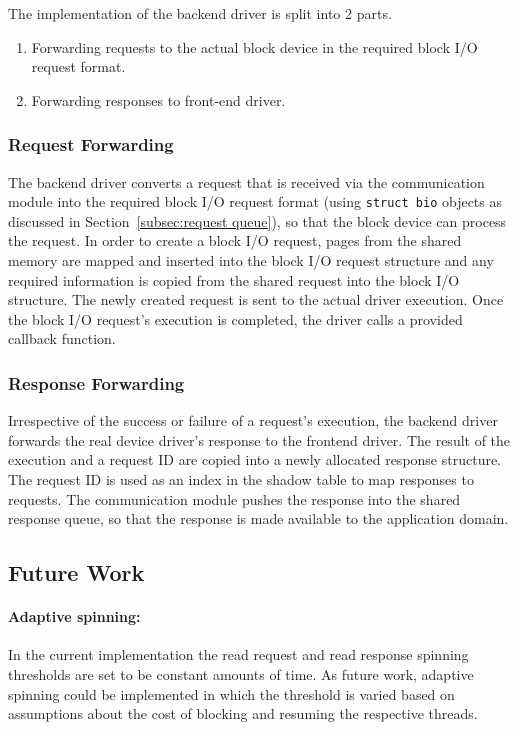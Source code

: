 The implementation of the backend driver is split into 2 parts. 
\begin{enumerate}
\item Forwarding requests to the actual block device in the required block I/O request format. 
\item Forwarding responses to front-end driver.
\end{enumerate}

\subsubsection*{Request Forwarding}
\label{subsec:createbio}
The backend driver converts a request that is received via the
communication module into the required block I/O request format (using \texttt{struct bio} objects
as discussed in Section~\ref{subsec:request queue}), so that the block device
can process the request. In order to create a block I/O request, pages from
the shared memory are mapped and inserted into the block I/O request structure and
any required information is copied from the shared request into the block I/O
structure. The newly created request is sent to the actual driver execution. 
Once the block I/O request's execution is completed, the driver calls a provided
callback function.

\subsubsection*{Response Forwarding}
Irrespective of the success or failure of a request's execution,
the backend driver forwards the real device driver's response to the frontend
driver.  The result of the execution and a request ID are
copied into a newly allocated response structure. The request ID is used
as an index in the shadow table to map responses to requests. The
communication module pushes the response into the shared response queue, 
so that the response is made available to the application domain.

\subsection{Future Work}
\paragraph{Adaptive spinning: }
In the current implementation the read request and read response
spinning thresholds are set to be constant amounts of time. 
As future work, adaptive spinning could be implemented in which the
threshold is varied based on assumptions about the cost of blocking
and resuming the respective threads.

